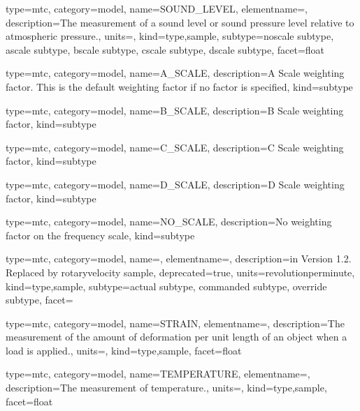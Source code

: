 {
  type=mtc,
  category=model,
  name={SOUND\_LEVEL},
  elementname=,
  description={The measurement of a sound level or sound pressure level relative to atmospheric pressure.},
  units=,
  kind={type,sample},
  subtype={\gls{noscale subtype}, \gls{ascale subtype}, \gls{bscale subtype}, \gls{cscale subtype}, \gls{dscale subtype}},
  facet={\gls{float}}
}


{
  type=mtc,
  category=model,
  name={A\_SCALE},
  description={A Scale weighting factor.   This is the default weighting factor if no factor is specified},
  kind={subtype}
}


{
  type=mtc,
  category=model,
  name={B\_SCALE},
  description={B Scale weighting factor},
  kind={subtype}
}


{
  type=mtc,
  category=model,
  name={C\_SCALE},
  description={C Scale weighting factor},
  kind={subtype}
}


{
  type=mtc,
  category=model,
  name={D\_SCALE},
  description={D Scale weighting factor},
  kind={subtype}
}


{
  type=mtc,
  category=model,
  name={NO\_SCALE},
  description={No weighting factor on the frequency scale},
  kind={subtype}
}


{
  type=mtc,
  category=model,
  name={},
  elementname=,
  description={\DEPRECATED in Version 1.2.  Replaced by \gls{rotaryvelocity sample}},
  deprecated={true},
  units={\gls{revolutionperminute}},
  kind={type,sample},
  subtype={\gls{actual subtype}, \gls{commanded subtype}, \gls{override subtype}},
  facet={}
}



{
  type=mtc,
  category=model,
  name={STRAIN},
  elementname=,
  description={The measurement of the amount of deformation per unit length of an object when a load is applied.},
  units=,
  kind={type,sample},
  facet={\gls{float}}
}


{
  type=mtc,
  category=model,
  name={TEMPERATURE},
  elementname=,
  description={The measurement of temperature.},
  units=,
  kind={type,sample},
  facet={\gls{float}}
}


